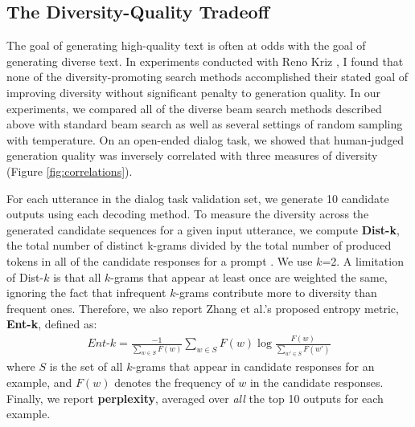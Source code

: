 \begin{itemize}
\subsection{The Diversity-Quality Tradeoff}
The goal of generating high-quality text is often at odds with the goal of generating diverse text.
In experiments conducted with Reno Kriz \citep{ippolito2019comparison}, I found that none of the diversity-promoting search methods accomplished their stated goal of improving diversity without significant penalty to generation quality.
In our experiments, we compared all of the diverse beam search methods described above with standard beam search as well as several settings of random sampling with temperature.
On an open-ended dialog task, we showed that human-judged generation quality was inversely correlated with three measures of diversity (Figure \ref{fig:correlations}).

For each utterance in the dialog task validation set, we generate 10 candidate outputs using each decoding method.
To measure the diversity across the generated candidate sequences for a given input utterance, we compute \textbf{Dist-k}, the total number of distinct k-grams divided by the total number of produced tokens in all of the candidate responses for a prompt \citep{li2016diversity}. 
We use $k$=2.
A limitation of Dist-$k$ is that all $k$-grams that appear at least once are weighted the same, ignoring the fact that infrequent $k$-grams contribute more to diversity than frequent ones. 
Therefore, we also report Zhang et al.'s \citep{zhang2018generating} proposed entropy metric, \textbf{Ent-k}, defined as:
 \begin{align*}
 \textit{Ent-k} = \frac{-1} {\sum_{w \in S}F(w)} \sum_{w \in S} F(w) \log \frac{F(w)} {\sum_{w' \in S} F(w')}
 \end{align*}
 where $S$ is the set of all $k$-grams that appear in candidate responses for an example, and $F(w)$ denotes the frequency of $w$ in the candidate responses.
Finally, we report \textbf{perplexity}, averaged over \textit{all} the top 10 outputs for each example.


\end{itemize}
